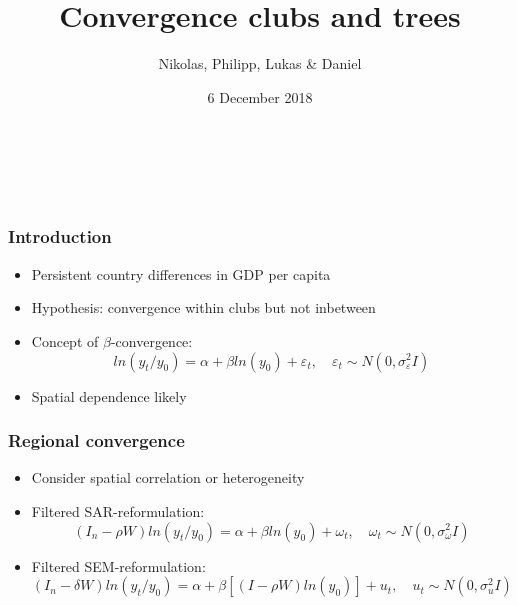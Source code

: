 \documentclass{beamer}
\title{Convergence clubs and trees}
\author{Nikolas, Philipp, Lukas \& Daniel}
\date{6 December 2018}
\begin{document}
\begin{frame}[plain]
  \titlepage
  \begin{center}
   \textcite{postiglione2010regression} \\
    \\
  \end{center}
\end{frame}


\begin{frame}
  \frametitle{Introduction}
  \begin{itemize}
  \item Persistent country differences in GDP per capita\footnotemark
  \item Hypothesis: convergence within clubs but not inbetween
  \item Concept of $\beta$-convergence:
    $$
    ln(y_t / y_0) = \alpha + \beta ln(y_0) + \varepsilon_t, \quad \varepsilon_t \sim N(0, \sigma_\varepsilon^2 I)
    $$
  \item Spatial dependence likely\footnotemark
  \end{itemize}
\end{frame}

\begin{frame}
  \frametitle{Regional convergence}
  \begin{itemize}
  \item Consider spatial correlation or heterogeneity
  \item Filtered SAR-reformulation: 
    $$
    (I_n - \rho W) ln(y_t/y_0) = \alpha + \beta ln(y_0) + \omega_t, \quad \omega_t \sim N(0, \sigma_\omega^2 I)
    $$
  \item Filtered SEM-reformulation: 
    $$
    (I_n -\delta W) ln(y_t/y_0) = \alpha + \beta \left[(I-\rho W) ln(y_0)\right] + u_t, \quad u_t \sim N(0, \sigma_u^2 I)
    $$
  \end{itemize}
\end{frame}
\end{document}
